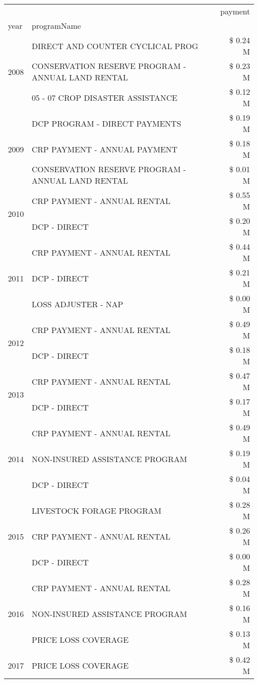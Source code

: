 \begin{tabular}{llr}
\toprule
 &  & payment \\
year & programName &  \\
\midrule
\multirow[t]{3}{*}{2008} & DIRECT AND COUNTER CYCLICAL PROG & \$ 0.24 M \\
 & CONSERVATION RESERVE PROGRAM - ANNUAL LAND RENTAL & \$ 0.23 M \\
 & 05 - 07 CROP DISASTER ASSISTANCE & \$ 0.12 M \\
\cline{1-3}
\multirow[t]{3}{*}{2009} & DCP PROGRAM - DIRECT PAYMENTS & \$ 0.19 M \\
 & CRP PAYMENT - ANNUAL PAYMENT & \$ 0.18 M \\
 & CONSERVATION RESERVE PROGRAM - ANNUAL LAND RENTAL & \$ 0.01 M \\
\cline{1-3}
\multirow[t]{2}{*}{2010} & CRP PAYMENT - ANNUAL RENTAL & \$ 0.55 M \\
 & DCP - DIRECT & \$ 0.20 M \\
\cline{1-3}
\multirow[t]{3}{*}{2011} & CRP PAYMENT - ANNUAL RENTAL & \$ 0.44 M \\
 & DCP - DIRECT & \$ 0.21 M \\
 & LOSS ADJUSTER - NAP & \$ 0.00 M \\
\cline{1-3}
\multirow[t]{2}{*}{2012} & CRP PAYMENT - ANNUAL RENTAL & \$ 0.49 M \\
 & DCP - DIRECT & \$ 0.18 M \\
\cline{1-3}
\multirow[t]{2}{*}{2013} & CRP PAYMENT - ANNUAL RENTAL & \$ 0.47 M \\
 & DCP - DIRECT & \$ 0.17 M \\
\cline{1-3}
\multirow[t]{3}{*}{2014} & CRP PAYMENT - ANNUAL RENTAL & \$ 0.49 M \\
 & NON-INSURED ASSISTANCE PROGRAM & \$ 0.19 M \\
 & DCP - DIRECT & \$ 0.04 M \\
\cline{1-3}
\multirow[t]{3}{*}{2015} & LIVESTOCK FORAGE PROGRAM & \$ 0.28 M \\
 & CRP PAYMENT - ANNUAL RENTAL & \$ 0.26 M \\
 & DCP - DIRECT & \$ 0.00 M \\
\cline{1-3}
\multirow[t]{3}{*}{2016} & CRP PAYMENT - ANNUAL RENTAL & \$ 0.28 M \\
 & NON-INSURED ASSISTANCE PROGRAM & \$ 0.16 M \\
 & PRICE LOSS COVERAGE & \$ 0.13 M \\
\cline{1-3}
\multirow[t]{3}{*}{2017} & PRICE LOSS COVERAGE & \$ 0.42 M \\

\end{tabular}

